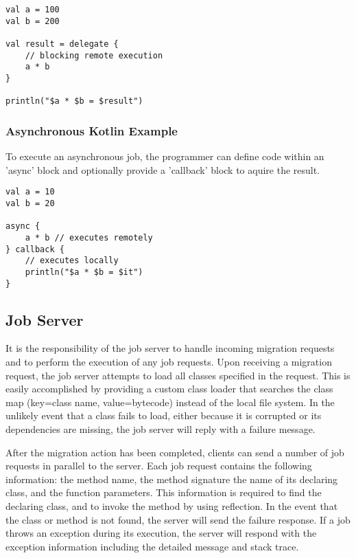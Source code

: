 \begin{lstlisting}
val a = 100
val b = 200

val result = delegate {
    // blocking remote execution
    a * b
}

println("$a * $b = $result")
\end{lstlisting}

\subsubsection{Asynchronous Kotlin Example}

To execute an asynchronous job, the programmer can define code within an
'async' block and optionally provide a 'callback' block to aquire the result.

\begin{lstlisting}
val a = 10
val b = 20

async {
    a * b // executes remotely
} callback {
    // executes locally
    println("$a * $b = $it")
}
\end{lstlisting}

\subsection{Job Server}\label{subsec:jobServer}

It is the responsibility of the job server to handle incoming
migration requests and to perform the execution of any job requests.
Upon receiving a migration request, the job server attempts to
load all classes specified in the request.
This is easily accomplished by providing a custom class loader
that searches the class map (key=class name, value=bytecode) instead
of the local file system.
In the unlikely event that a class fails to load, either because it is corrupted or
its dependencies are missing, the job server will reply with a failure message.

After the migration action has been completed, clients can send a number of job requests
in parallel to the server.
Each job request contains the following information: the method name, the method signature
the name of its declaring class, and the function parameters.
This information is required to find the declaring class, and to invoke the method
by using reflection.
In the event that the class or method is not found, the server will send the failure
response.
If a job throws an exception during its execution, the server will respond with
the exception information including the detailed message and stack trace.

